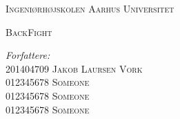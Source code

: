 \begin{titlingpage}
	\center %
	
	\textsc{\LARGE Ingeniørhøjskolen Aarhus Universitet}\\[1.5cm]
	
	

	\begin{vplace}[0.7]
		\textsc{\LARGE BackFight}\\[0.5cm] 		
		
		\vspace{15mm}
	
		\begin{minipage}{0.4\textwidth}
			\begin{flushleft} \large
				
				\emph{Forfattere:}\\ 
				
				201404709 \textsc{Jakob Laursen Vork}\\
				012345678 \textsc{Someone}\\
				012345678 \textsc{Someone}\\
				012345678 \textsc{Someone}\\
				
			\end{flushleft}
		\end{minipage}

	\end{vplace}	
\end{titlingpage}